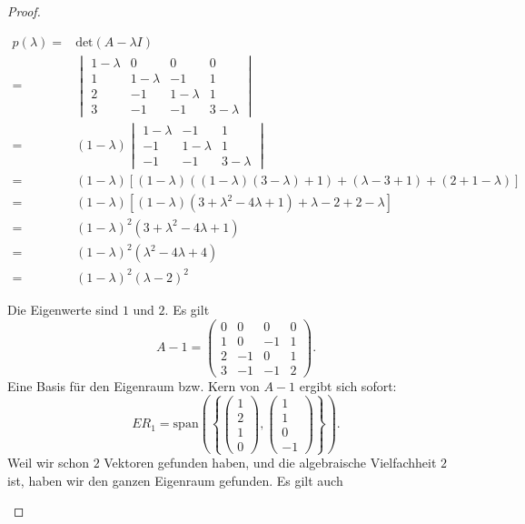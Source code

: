 \begin{proof}
	\begin{parts}
	\item 
		\begin{align*}
			p(\lambda)=&\text{det}(A-\lambda I)\\
			=& \begin{vmatrix}
				1 - \lambda & 0 & 0 & 0\\1 & 1-\lambda & -1 & 1\\2 & -1 & 1-\lambda & 1\\3 & -1 & -1 & 3-\lambda
			\end{vmatrix}\\
				=&(1-\lambda)\begin{vmatrix}
					1-\lambda & -1 & 1 \\ -1 & 1-\lambda & 1 \\ -1 & -1 & 3-\lambda
				\end{vmatrix}\\
					=&(1-\lambda)\left[ (1-\lambda)((1-\lambda)(3-\lambda)+1)+(\lambda-3+1)+(2+1-\lambda) \right] \\
					=&(1-\lambda)\left[ (1-\lambda)(3+\lambda^2-4\lambda+1)+\lambda-2+2-\lambda \right] \\
					=&(1-\lambda)^2(3+\lambda^2-4\lambda+1)\\
					=&(1-\lambda)^2(\lambda^2-4\lambda+4)\\
					=&(1-\lambda)^2(\lambda-2)^2
		\end{align*}
	\item Die Eigenwerte sind $1$ und $2$. Es gilt
		\[
			A-1=\begin{pmatrix} 0 & 0 & 0 & 0 \\ 1 & 0 & -1 & 1 \\ 2 & -1 & 0 & 1 \\ 3 & -1 & -1 & 2 \end{pmatrix} 
		.\] 
		Eine Basis f\"{u}r den Eigenraum bzw. Kern von $A-1$ ergibt sich sofort:
		\[
			ER_{1}=\text{span}\left(\left\{ \begin{pmatrix} 1 \\ 2 \\ 1 \\ 0 \end{pmatrix} , \begin{pmatrix} 1 \\ 1 \\ 0 \\ -1 \end{pmatrix}  \right\}\right) 
		.\] 
		Weil wir schon $2$ Vektoren gefunden haben, und die algebraische Vielfachheit $2$ ist, haben wir den ganzen Eigenraum gefunden. Es gilt auch

\end{parts}
\end{proof}
